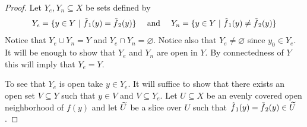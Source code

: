 \documentclass[11pt, letterpaper, oneside]{report}
\theoremstyle{pplain}
\theoremstyle{ddefinition}
\theoremstyle{nnn}
\theoremstyle{eexercise}
\newcommand{\ntilde}{\skew{3}\tilde}
\newcommand{\nwidetilde}{\skew{4}\widetilde}
\begin{document}
\begin{proof}
Let $Y_{e}, Y_{n}\subseteq X$ be sets defined by 
$$Y_{e} = \{y\in Y \ | \ \ntilde{f}_{1}(y) = \ntilde{f}_{2}(y) \} 
\ \ \ \ \text{and} \ \ \ \  Y_{n} = \{y\in Y \ | \ \ntilde{f}_{1}(y) \neq \ntilde{f}_{2}(y) \}$$
Notice that $Y_{e}\cup Y_{n} = Y$ and $Y_{e}\cap Y_{n} = \varnothing$. Notice also that 
$Y_{e}\neq \varnothing$ since $y_{0}\in Y_{e}$. It will be enough to show that $Y_{e}$ and $Y_{n}$
are open in $Y$. By connectedness of $Y$ this will imply that $Y_{e} = Y$. 

To see that $Y_{e}$ is open take $y\in Y_{e}$. It will suffice to show that there exists an open 
set $V\subseteq Y$ such that $y\in V$ and $V\subseteq Y_{e}$. Let $U\subseteq X$ be an evenly covered 
open neighborhood of $f(y)$ and let $\nwidetilde{U}$ be a slice over $U$ such that 
$\ntilde{f}_{1}(y) = \ntilde{f}_{2}(y) \in \nwidetilde{U}$.

\end{proof}
\end{document}
